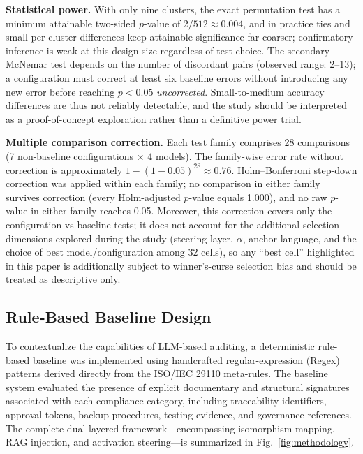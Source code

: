 \documentclass{ieeeaccess}
\begin{document}
\textbf{Statistical power.} With only nine clusters, the exact permutation test has a minimum attainable two-sided $p$-value of $2/512\approx0.004$, and in practice ties and small per-cluster differences keep attainable significance far coarser; confirmatory inference is weak at this design size regardless of test choice. The secondary McNemar test depends on the number of discordant pairs (observed range: 2--13); a configuration must correct at least six baseline errors without introducing any new error before reaching $p<0.05$ \emph{uncorrected}. Small-to-medium accuracy differences are thus not reliably detectable, and the study should be interpreted as a proof-of-concept exploration rather than a definitive power trial.

\textbf{Multiple comparison correction.} Each test family comprises 28 comparisons (7 non-baseline configurations $\times$ 4 models). The family-wise error rate without correction is approximately $1-(1-0.05)^{28} \approx 0.76$. Holm--Bonferroni step-down correction was applied within each family; no comparison in either family survives correction (every Holm-adjusted $p$-value equals 1.000), and no raw $p$-value in either family reaches 0.05. Moreover, this correction covers only the configuration-vs-baseline tests; it does not account for the additional selection dimensions explored during the study (steering layer, $\alpha$, anchor language, and the choice of best model/configuration among 32 cells), so any ``best cell'' highlighted in this paper is additionally subject to winner's-curse selection bias and should be treated as descriptive only.

\subsection{Rule-Based Baseline Design}
\label{sec:baseline}

To contextualize the capabilities of LLM-based auditing, a deterministic rule-based baseline was implemented using handcrafted regular-expression (Regex) patterns derived directly from the ISO/IEC 29110 meta-rules. The baseline system evaluated the presence of explicit documentary and structural signatures associated with each compliance category, including traceability identifiers, approval tokens, backup procedures, testing evidence, and governance references. The complete dual-layered framework---encompassing isomorphism mapping, RAG injection, and activation steering---is summarized in Fig.~\ref{fig:methodology}.
\end{document}
